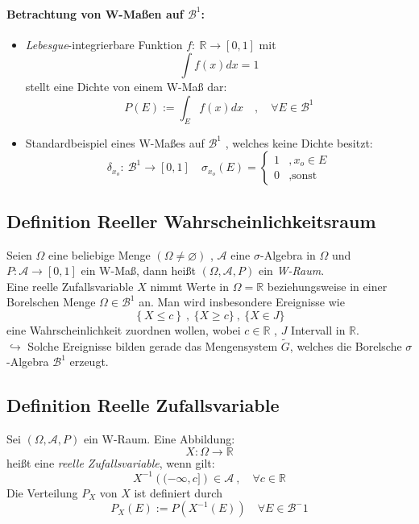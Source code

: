 \documentclass[12pt,a4paper]{article}
\begin{document}
	\paragraph{Betrachtung von W-Maßen auf $\mathcal{B}^1$:}
	\begin{itemize}
		\item \textit{Lebesgue}-integrierbare Funktion $f:\: \mathbb{R}\rightarrow[0,1]$ mit
		$$\int f(x) dx = 1$$
		stellt eine Dichte von einem W-Maß dar:
		$$P(E):=\int_E f(x) dx \quad , \quad \forall E\in \mathcal{B}^1$$
		\item Standardbeispiel eines W-Maßes auf $\mathcal{B}^1$ , welches keine Dichte besitzt:
		\[
 	\delta_{x_o}: \: \mathcal{B}^1\rightarrow [0,1] \quad \sigma_{x_o}(E)=\left\{\begin{array}{lr}
 		1 &, x_o\in E\\
 		0 &,\text{sonst }
 	   \end{array}\right.
 		\]
			
	\end{itemize}
	
	\subsection{Definition Reeller Wahrscheinlichkeitsraum}
	Seien $\Omega$ eine beliebige Menge $(\Omega\neq\varnothing)$ , $\mathcal{A}$ eine $\sigma$-Algebra in $\Omega$ und $P: \mathcal{A}\rightarrow[0,1]$ ein W-Maß, dann heißt $(\Omega, \mathcal{A},P)$ ein \textit{W-Raum}.\\
	Eine reelle Zufallsvariable $X$ nimmt Werte in $\Omega=\mathbb{R}$ beziehungsweise in einer Borelschen Menge $\Omega\in\mathcal{B}^1$ an.
	Man wird insbesondere Ereignisse wie
	$$\left\{ X\leq c\right\} \: , \: \{X\geq c\} \: , \: \{X\in J\}$$
	eine Wahrscheinlichkeit zuordnen wollen, wobei $c\in\mathbb{R}$ , $J$ Intervall in $\mathbb{R}$.\\
	$\hookrightarrow$ Solche Ereignisse bilden gerade das Mengensystem $\tilde{G}$, welches die Borelsche $\sigma$-Algebra $\mathcal{B}^1$ erzeugt.
	
	\subsection{Definition Reelle Zufallsvariable}
	Sei $(\Omega ,\mathcal{A}, P)$ ein W-Raum. Eine Abbildung:
	$$X:\Omega\rightarrow\mathbb{R}$$
	heißt eine \textit{reelle Zufallsvariable}, wenn gilt:
	$$X^{-1}\left((-\infty, c]\right) \in \mathcal{A} \: , \quad \forall c \in\mathbb{R}$$
	Die Verteilung $P_X$ von $X$ ist definiert durch
	$$P_X(E):= P\left(X^{-1} (E)\right) \quad \forall E\in\mathcal{B}^-1$$
	
\end{document}
